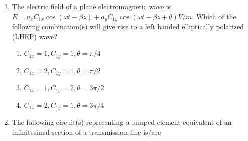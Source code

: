 \documentclass[a4paper, 11pt]{article}
\begin{document}
\begin{enumerate}
    \hfill{}
    
    \item The electric field of a plane electromagnetic wave is
    $E = a_x C_{1x} \cos(\omega t - \beta z) + a_y C_{1y} \cos(\omega t - \beta z + \theta) V/m$.
    Which of the following combination(s) will give rise to a left handed elliptically polarized (LHEP) wave?
    
    \begin{enumerate}
        \item $C_{1x}=1, C_{1y}=1, \theta=\pi/4$
        \item $C_{1x}=2, C_{1y}=1, \theta=\pi/2$
        \item $C_{1x}=1, C_{1y}=2, \theta=3\pi/2$
        \item $C_{1x}=2, C_{1y}=1, \theta=3\pi/4$
    \end{enumerate}

    \hfill{}
    
    \item The following circuit(s) representing a lumped element equivalent of an infinitesimal section of a transmission line is/are
    

\end{enumerate}
\end{document}
